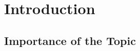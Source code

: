 \chapter{Introduction}
\label{chapter-introduction} 
\newcommand{\keyword}[1]{\textbf{#1}}
\newcommand{\tabhead}[1]{\textbf{#1}}
\newcommand{\code}[1]{\texttt{#1}}
\newcommand{\file}[1]{\texttt{\bfseries#1}}
\newcommand{\option}[1]{\texttt{\itshape#1}}
\section{Importance of the Topic}


